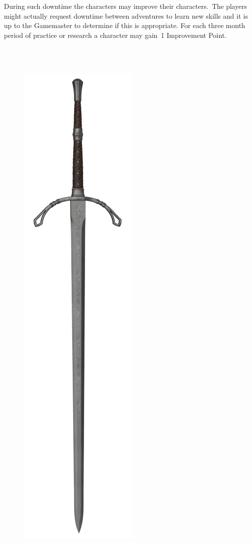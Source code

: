 During such downtime the characters may improve their characters. The players might actually request downtime between adventures to learn new skills and it is up to the Gamemaster to determine if this is appropriate.  
For each three month period of practice or research a character may gain 1 Improvement Point. 

\phantom{.}\\
\phantom{.}\\

\begin{figure}[h]
\begin{center}
  \includegraphics[scale=0.17]{img/Longsword.png}
\end{center}
\end{figure}

